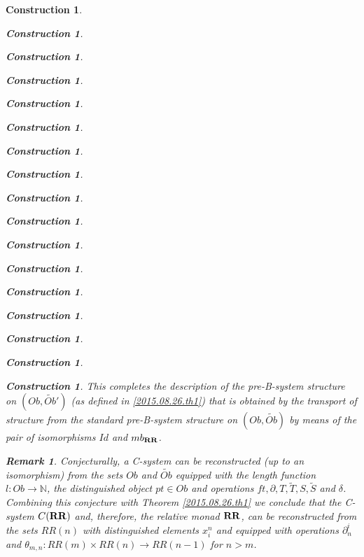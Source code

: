 \documentclass[onecolumn,12pt]{amsart}
\newtheorem{remark}[proposition]{Remark}
\numberwithin{proposition}{subsection}
\newtheorem{construction}[proposition]{Construction}
\newcommand{\sr}{\rightarrow}
\newcommand{\nn}{{\mathbb N}}
\newcommand{\wt}{\widetilde}
\newcommand{\RR}{{\bf RR}}
\begin{document}
\begin{construction}
\begin{construction}
\begin{construction}
\begin{construction}
\begin{construction}
\begin{construction}
\begin{construction}
\begin{construction}
\begin{construction}
\begin{construction}
\begin{construction}
\begin{construction}
\begin{construction}
\begin{construction}
\begin{construction}
\begin{construction}
\begin{construction}
This completes the description of the pre-B-system structure on $(Ob,\wt{Ob}')$
(as defined in \ref{2015.08.26.th1})
that is obtained by the transport of structure from the standard pre-B-system
structure on $(Ob,\wt{Ob})$ by means of the pair of isomorphisms $Id$ and
$mb_{\RR}$.
%
\begin{remark}\rm
\label{2015.08.29.rem2} 
Conjecturally, a C-system can be reconstructed (up to
an isomorphism) from the sets $Ob$ and $\wt{Ob}$ equipped with the length
function $l:Ob\sr\nn$, the distinguished object $pt\in Ob$ and operations $ft,
\partial, T,\wt{T},S,\wt{S}$ and $\delta$. Combining this conjecture with
Theorem \ref{2015.08.26.th1} we conclude that the C-system $C(\RR)$ and,
therefore, the relative monad $\RR$, can be reconstructed from the sets $RR(n)$
with distinguished elements $x^n_i$ and equipped with operations $\partial_n^i$
and $\theta_{m,n}:RR(m)\times RR(n)\sr RR(n-1)$ for $n>m$.


\end{remark}
\end{construction}
\end{construction}
\end{construction}
\end{construction}
\end{construction}
\end{construction}
\end{construction}
\end{construction}
\end{construction}
\end{construction}
\end{construction}
\end{construction}
\end{construction}
\end{construction}
\end{construction}
\end{construction}
\end{construction}
\end{document}

